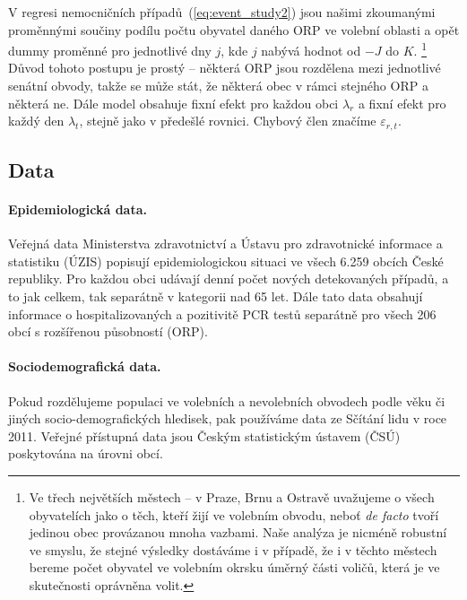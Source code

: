 V regresi nemocničních případů~(\ref{eq:event_study2}) jsou našimi zkoumanými proměnnými součiny podílu počtu obyvatel daného ORP ve volební oblasti a opět dummy proměnné pro jednotlivé dny $j$, kde $j$ nabývá hodnot od $-J$ do $K$. \footnote{Ve třech největších městech -- v Praze, Brnu a Ostravě uvažujeme o všech obyvatelích jako o těch, kteří žijí ve volebním obvodu, neboť \textit{de facto} tvoří jedinou obec provázanou mnoha vazbami. Naše analýza je nicméně robustní ve smyslu, že stejné výsledky dostáváme i v případě, že i v těchto městech bereme počet obyvatel ve volebním okrsku úměrný části voličů, která je ve skutečnosti oprávněna volit.} Důvod tohoto postupu je prostý -- některá ORP jsou rozdělena mezi jednotlivé senátní obvody, takže se může stát, že některá obec v rámci stejného ORP  a některá ne. Dále model obsahuje fixní efekt pro každou obci $\lambda_{r}$ a fixní efekt pro každý den $\lambda_{t}$, stejně jako v předešlé rovnici. Chybový člen značíme $\varepsilon_{r,t}$.

\subsection*{Data}
\paragraph{Epidemiologická data.}  Veřejná data Ministerstva zdravotnictví a Ústavu pro zdravotnické informace a statistiku (ÚZIS) popisují epidemiologickou situaci ve všech 6.259 obcích České republiky. Pro každou obci udávají denní počet nových detekovaných případů, a to jak celkem, tak separátně v kategorii nad 65 let. Dále tato data obsahují informace o hospitalizovaných a pozitivitě PCR testů separátně pro všech 206 obcí s rozšířenou působností (ORP). 

\paragraph{Sociodemografická data.} 
Pokud rozdělujeme populaci ve volebních a nevolebních obvodech podle věku či jiných socio-demografických hledisek, pak používáme data ze Sčítání lidu v roce 2011. Veřejné přístupná data jsou Českým statistickým ústavem (ČSÚ) poskytována na úrovni obcí.

